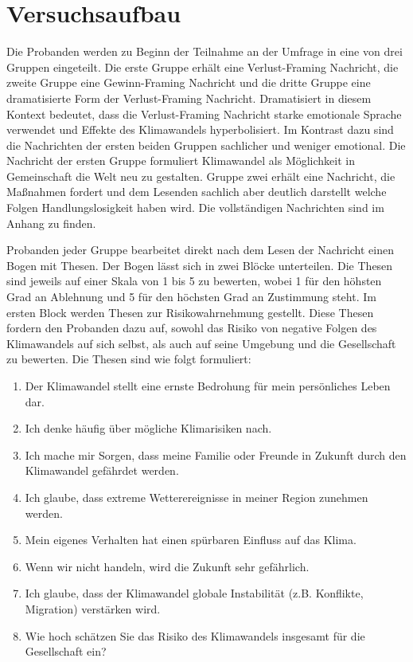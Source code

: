 \documentclass[12pt,twoside=off,
bibtotoc,liststotoc,appendixprefix,paper=a4,headings=small]{scrbook} %
\begin{document}
\section{Versuchsaufbau}
Die Probanden werden zu Beginn der Teilnahme an der Umfrage in eine von drei Gruppen eingeteilt.
Die erste Gruppe erhält eine Verlust-Framing Nachricht, die zweite Gruppe eine Gewinn-Framing Nachricht und  die dritte Gruppe eine dramatisierte Form der Verlust-Framing Nachricht. Dramatisiert in diesem Kontext bedeutet, dass die Verlust-Framing Nachricht starke emotionale Sprache verwendet und Effekte des Klimawandels hyperbolisiert.
Im Kontrast dazu sind die Nachrichten der ersten beiden Gruppen sachlicher und weniger emotional.
Die Nachricht der ersten Gruppe formuliert Klimawandel als Möglichkeit in Gemeinschaft die Welt neu zu gestalten.
Gruppe zwei erhält eine Nachricht, die Maßnahmen fordert und dem Lesenden sachlich aber deutlich darstellt welche Folgen Handlungslosigkeit haben wird.
Die vollständigen Nachrichten sind im Anhang zu finden.

Probanden jeder Gruppe bearbeitet direkt nach dem Lesen der Nachricht einen Bogen mit Thesen. Der Bogen lässt sich in zwei Blöcke unterteilen. Die Thesen sind jeweils auf einer Skala von 1 bis 5 zu bewerten, wobei 1 für den höhsten Grad an Ablehnung und 5 für den höchsten Grad an Zustimmung steht.
Im ersten Block werden Thesen zur Risikowahrnehmung gestellt. Diese Thesen fordern den Probanden dazu auf, sowohl das Risiko von negative Folgen des Klimawandels auf sich selbst, als auch auf seine Umgebung und die Gesellschaft zu bewerten. Die Thesen sind wie folgt formuliert:

\begin{enumerate}
  \item Der Klimawandel stellt eine ernste Bedrohung für mein persönliches Leben dar.
  \item Ich denke häufig über mögliche Klimarisiken nach.
  \item Ich mache mir Sorgen, dass meine Familie oder Freunde in Zukunft durch den Klimawandel gefährdet werden.
  \item Ich glaube, dass extreme Wetterereignisse in meiner Region zunehmen werden.
  \item Mein eigenes Verhalten hat einen spürbaren Einfluss auf das Klima.
  \item Wenn wir nicht handeln, wird die Zukunft sehr gefährlich.
  \item Ich glaube, dass der Klimawandel globale Instabilität (z.B. Konflikte, Migration) verstärken wird.
  \item Wie hoch schätzen Sie das Risiko des Klimawandels insgesamt für die Gesellschaft ein?
\end{enumerate}
\end{document}
